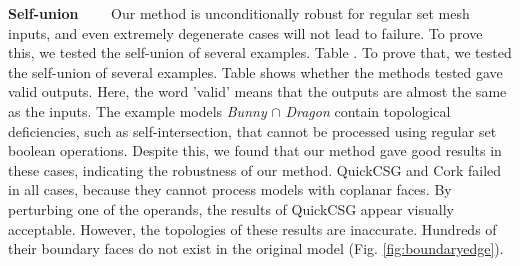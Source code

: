 \vspace{0.5em}
\noindent\textbf{Self-union}~~~~
Our method is unconditionally robust for regular set mesh inputs, and even extremely degenerate cases will not lead to failure. To prove this, we tested the self-union of several examples. Table . To prove that, we tested the self-union of several examples. Table  shows whether the methods tested gave valid outputs. Here, the word 'valid' means that the outputs are almost the same as the inputs. The example models \emph{Bunny} $\cap$ \emph{Dragon}  contain topological deficiencies, such as self-intersection, that cannot be processed using regular set boolean operations. Despite this, we found that our method gave good results in these cases, indicating the robustness of our method. QuickCSG and Cork failed in all cases, because they cannot process models with coplanar faces. By perturbing one of the operands, the results of QuickCSG appear visually acceptable. However, the topologies of these results are inaccurate. Hundreds of their boundary faces do not exist in the original model (Fig.  \ref{fig:boundaryedge}).


